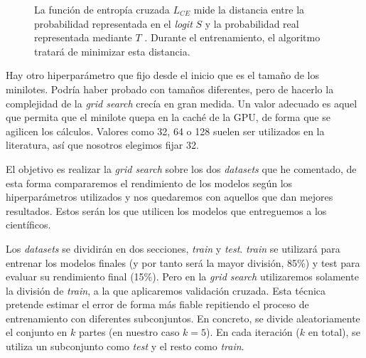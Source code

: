 \begin{figure}[H]
\centering
    \caption{La función de entropía cruzada $L_{CE}$ mide la distancia entre la probabilidad representada en el \textit{logit} $S$ y la probabilidad real representada mediante $T$ \cite{crossentropyloss}. Durante el entrenamiento, el algoritmo tratará de minimizar esta distancia.}
\end{figure}

Hay otro hiperparámetro que fijo desde el inicio que es el tamaño de los minilotes. Podría haber probado con tamaños diferentes, pero de hacerlo la complejidad de la \textit{grid search} crecía en gran medida. Un valor adecuado es aquel que permita que el minilote quepa en la caché de la GPU, de forma que se agilicen los cálculos. Valores como 32, 64 o 128 suelen ser utilizados en la literatura, así que nosotros elegimos fijar 32. \cite{batch-size}

El objetivo es realizar la \textit{grid search} sobre los dos \textit{datasets} que he comentado, de esta forma compararemos el rendimiento de los modelos según los hiperparámetros utilizados y nos quedaremos con aquellos que dan mejores resultados. Estos serán los que utilicen los modelos que entreguemos a los científicos.

Los \textit{datasets} se dividirán en dos secciones, \textit{train} y \textit{test}. \textit{train} se utilizará para entrenar los modelos finales (y por tanto será la mayor división, 85\%) y test para evaluar su rendimiento final (15\%). Pero en la \textit{grid search} utilizaremos solamente la división de \textit{train}, a la que aplicaremos validación cruzada. Esta técnica pretende estimar el error de forma más fiable repitiendo el proceso de entrenamiento con diferentes subconjuntos. En concreto, se divide aleatoriamente el conjunto en $k$ partes (en nuestro caso $k=5$). En cada iteración ($k$ en total), se utiliza un subconjunto como \textit{test} y el resto como \textit{train}. \cite{berzal2018redes}


